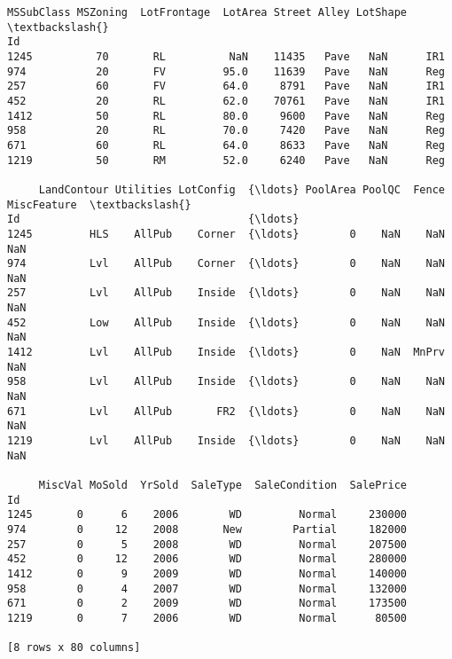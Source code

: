 \documentclass[11pt]{article}
\makeatletter
\newcommand{\boxspacing}{\kern\kvtcb@left@rule\kern\kvtcb@boxsep}
\newcommand{\prompt}[4]{
        {\ttfamily\llap{{\color{#2}[#3]:\hspace{3pt}#4}}\vspace{-\baselineskip}}
    }
\makeatother
\begin{document}
            \begin{tcolorbox}[breakable, size=fbox, boxrule=.5pt, pad at break*=1mm, opacityfill=0]
\prompt{Out}{outcolor}{3}{\boxspacing}
\begin{Verbatim}[commandchars=\\\{\}]
      MSSubClass MSZoning  LotFrontage  LotArea Street Alley LotShape  \textbackslash{}
Id
1245          70       RL          NaN    11435   Pave   NaN      IR1
974           20       FV         95.0    11639   Pave   NaN      Reg
257           60       FV         64.0     8791   Pave   NaN      IR1
452           20       RL         62.0    70761   Pave   NaN      IR1
1412          50       RL         80.0     9600   Pave   NaN      Reg
958           20       RL         70.0     7420   Pave   NaN      Reg
671           60       RL         64.0     8633   Pave   NaN      Reg
1219          50       RM         52.0     6240   Pave   NaN      Reg

     LandContour Utilities LotConfig  {\ldots} PoolArea PoolQC  Fence MiscFeature  \textbackslash{}
Id                                    {\ldots}
1245         HLS    AllPub    Corner  {\ldots}        0    NaN    NaN         NaN
974          Lvl    AllPub    Corner  {\ldots}        0    NaN    NaN         NaN
257          Lvl    AllPub    Inside  {\ldots}        0    NaN    NaN         NaN
452          Low    AllPub    Inside  {\ldots}        0    NaN    NaN         NaN
1412         Lvl    AllPub    Inside  {\ldots}        0    NaN  MnPrv         NaN
958          Lvl    AllPub    Inside  {\ldots}        0    NaN    NaN         NaN
671          Lvl    AllPub       FR2  {\ldots}        0    NaN    NaN         NaN
1219         Lvl    AllPub    Inside  {\ldots}        0    NaN    NaN         NaN

     MiscVal MoSold  YrSold  SaleType  SaleCondition  SalePrice
Id
1245       0      6    2006        WD         Normal     230000
974        0     12    2008       New        Partial     182000
257        0      5    2008        WD         Normal     207500
452        0     12    2006        WD         Normal     280000
1412       0      9    2009        WD         Normal     140000
958        0      4    2007        WD         Normal     132000
671        0      2    2009        WD         Normal     173500
1219       0      7    2006        WD         Normal      80500

[8 rows x 80 columns]
\end{Verbatim}
\end{tcolorbox}
        
\end{document}
